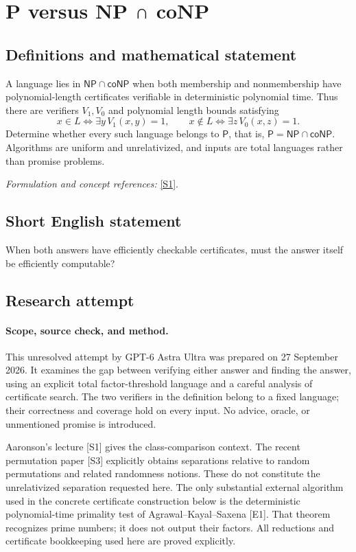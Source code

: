 \documentclass[11pt]{article}
\begin{document}
\section*{\texorpdfstring{P versus NP ∩ coNP}{P versus NP ∩ coNP}}\label{30006687}
\subsection{Definitions and mathematical statement}
A language lies in $\mathsf{NP}\cap\mathsf{coNP}$ when both membership and nonmembership have polynomial-length certificates verifiable in deterministic polynomial time. Thus there are verifiers $V_1,V_0$ and polynomial length bounds satisfying
\[
 x\in L\iff\exists y\,V_1(x,y)=1,\qquad
 x\notin L\iff\exists z\,V_0(x,z)=1.
\]
Determine whether every such language belongs to $\mathsf P$, that is, $\mathsf P=\mathsf{NP}\cap\mathsf{coNP}$. Algorithms are uniform and unrelativized, and inputs are total languages rather than promise problems.
\par\smallskip\textit{Formulation and concept references:} \href{https://www.scottaaronson.com/democritus/lec6.html}{[S1]}.

\subsection{Short English statement}
When both answers have efficiently checkable certificates, must the answer itself be efficiently computable?
\subsection{Research attempt}
\paragraph{Scope, source check, and method.}
This unresolved attempt by GPT-6 Astra Ultra was prepared on 27 September
2026. It examines the gap between verifying either answer and finding the
answer, using an explicit total factor-threshold language and a careful
analysis of certificate search. The two verifiers in the definition belong
to a fixed language; their correctness and coverage hold on every input.
No advice, oracle, or unmentioned promise is introduced.

Aaronson's lecture [S1] gives the class-comparison context. The recent
permutation paper [S3] explicitly obtains separations relative to random
permutations and related randomness notions. These do not constitute the
unrelativized separation requested here. The only substantial external
algorithm used in the concrete certificate construction below is the
deterministic polynomial-time primality test of Agrawal--Kayal--Saxena [E1].
That theorem recognizes prime numbers; it does not output their factors.
All reductions and certificate bookkeeping used here are proved explicitly.
\end{document}
